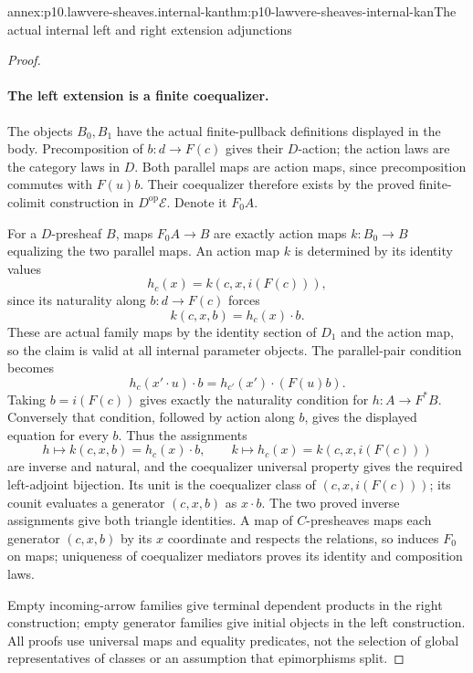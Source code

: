 \begin{annexitem}{annex:p10.lawvere-sheaves.internal-kan}{thm:p10-lawvere-sheaves-internal-kan}{The actual internal left and right extension adjunctions}
\begin{proof}
\paragraph{The left extension is a finite coequalizer.}
The objects \(B_0,B_1\) have the actual finite-pullback
definitions displayed in the body.  Precomposition of
\(b:d\to F(c)\) gives their \(D\)-action; the action
laws are the category laws in \(D\).
Both parallel maps are action maps, since precomposition
commutes with \(F(u)b\).  Their coequalizer therefore
exists by the proved finite-colimit construction in
\(D^{\mathrm{op}}\mathcal E\).  Denote it \(F_0A\).

For a \(D\)-presheaf \(B\), maps \(F_0A\to B\)
are exactly action maps \(k:B_0\to B\) equalizing the
two parallel maps.  An action map \(k\) is determined
by its identity values
\[
                   h_c(x)=k(c,x,i(F(c))),
\]
since its naturality along \(b:d\to F(c)\) forces
\[
                        k(c,x,b)=h_c(x)\cdot b.
\]
These are actual family maps by the identity section of
\(D_1\) and the action map, so the claim is valid at
all internal parameter objects.
The parallel-pair condition becomes
\[
      h_c(x'\cdot u)\cdot b
                  =h_{c'}(x')\cdot(F(u)b).
\]
Taking \(b=i(F(c))\) gives exactly the naturality
condition for \(h:A\to F^*B\).  Conversely that
condition, followed by action along \(b\), gives
the displayed equation for every \(b\).
Thus the assignments
\[
        h\longmapsto k(c,x,b)=h_c(x)\cdot b,
        \qquad k\longmapsto h_c(x)=k(c,x,i(F(c)))
\]
are inverse and natural, and the coequalizer universal
property gives the required left-adjoint bijection.
Its unit is the coequalizer class of
\((c,x,i(F(c)))\); its counit evaluates a generator
\((c,x,b)\) as \(x\cdot b\).
The two proved inverse assignments give both triangle
identities.  A map of \(C\)-presheaves maps each
generator \((c,x,b)\) by its \(x\) coordinate and
respects the relations, so induces \(F_0\) on maps;
uniqueness of coequalizer mediators proves its identity
and composition laws.

Empty incoming-arrow families give terminal dependent
products in the right construction; empty generator
families give initial objects in the left construction.
All proofs use universal maps and equality predicates,
not the selection of global representatives of classes
or an assumption that epimorphisms split.
\end{proof}
\end{annexitem}

